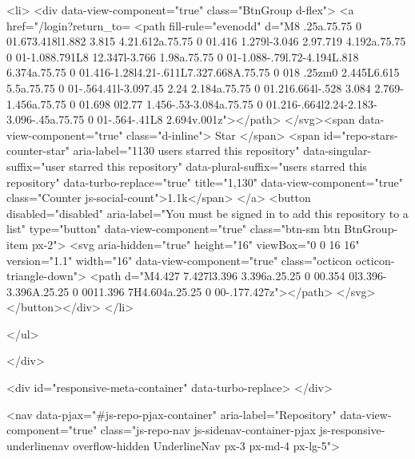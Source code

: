   <li>
        <div data-view-component="true" class="BtnGroup d-flex">
        <a href="/login?return_to=%
    <path fill-rule="evenodd" d="M8 .25a.75.75 0 01.673.418l1.882 3.815 4.21.612a.75.75 0 01.416 1.279l-3.046 2.97.719 4.192a.75.75 0 01-1.088.791L8 12.347l-3.766 1.98a.75.75 0 01-1.088-.79l.72-4.194L.818 6.374a.75.75 0 01.416-1.28l4.21-.611L7.327.668A.75.75 0 018 .25zm0 2.445L6.615 5.5a.75.75 0 01-.564.41l-3.097.45 2.24 2.184a.75.75 0 01.216.664l-.528 3.084 2.769-1.456a.75.75 0 01.698 0l2.77 1.456-.53-3.084a.75.75 0 01.216-.664l2.24-2.183-3.096-.45a.75.75 0 01-.564-.41L8 2.694v.001z"></path>
</svg><span data-view-component="true" class="d-inline">
          Star
</span>          <span id="repo-stars-counter-star" aria-label="1130 users starred this repository" data-singular-suffix="user starred this repository" data-plural-suffix="users starred this repository" data-turbo-replace="true" title="1,130" data-view-component="true" class="Counter js-social-count">1.1k</span>
</a>        <button disabled="disabled" aria-label="You must be signed in to add this repository to a list" type="button" data-view-component="true" class="btn-sm btn BtnGroup-item px-2">    <svg aria-hidden="true" height="16" viewBox="0 0 16 16" version="1.1" width="16" data-view-component="true" class="octicon octicon-triangle-down">
    <path d="M4.427 7.427l3.396 3.396a.25.25 0 00.354 0l3.396-3.396A.25.25 0 0011.396 7H4.604a.25.25 0 00-.177.427z"></path>
</svg>
</button></div>
  </li>

    

</ul>

      </div>

        <div id="responsive-meta-container" data-turbo-replace>
</div>


          <nav data-pjax="#js-repo-pjax-container" aria-label="Repository" data-view-component="true" class="js-repo-nav js-sidenav-container-pjax js-responsive-underlinenav overflow-hidden UnderlineNav px-3 px-md-4 px-lg-5">

